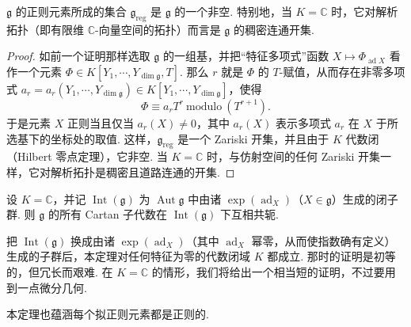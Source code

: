 \begin{lemma*}
$\mathfrak g$ 的正则元素所成的集合 $\mathfrak g_{\mathrm{reg}}$ 是 $\mathfrak g$ 的一个非空. 特别地，当 $K=\mathbb C$ 时，它对解析拓扑（即有限维 $\mathbb C$-向量空间的拓扑）而言是 $\mathfrak g$ 的稠密连通开集.
\end{lemma*}
\begin{proof}
如前一个证明那样选取 $\mathfrak g$ 的一组基，并把``特征多项式''函数 $X\mapsto\Phi_{\operatorname{ad}X}$ 看作一个元素 $\Phi\in K[Y_1,\cdots,Y_{\dim\mathfrak g},T]$. 那么 $r$ 就是 $\Phi$ 的 $T$-赋值，从而存在非零多项式 $a_r=a_r(Y_1,\cdots,Y_{\dim\mathfrak g})\in K[Y_1,\cdots,Y_{\dim\mathfrak g}]$，使得
\[\Phi\equiv a_rT^r\ \text{modulo}\ (T^{r+1}).\]
于是元素 $X$ 正则当且仅当 $a_r(X)\neq 0$，其中 $a_r(X)$ 表示多项式 $a_r$ 在 $X$ 于所选基下的坐标处的取值. 这样，$\mathfrak g_{\mathrm{reg}}$ 是一个 Zariski 开集，并且由于 $K$ 代数闭（Hilbert 零点定理），它非空. 当 $K=\mathbb C$ 时，与仿射空间的任何 Zariski 开集一样，它对解析拓扑是稠密且道路连通的开集.
\end{proof}
\begin{theorem*}
设 $K=\mathbb C$，并记 $\operatorname{Int}(\mathfrak g)$ 为 $\operatorname{Aut}\mathfrak g$ 中由诸 $\exp(\operatorname{ad}_X)$（$X\in\mathfrak g$）生成的闭子群. 则 $\mathfrak g$ 的所有 Cartan 子代数在 $\operatorname{Int}(\mathfrak g)$ 下互相共轭.
\end{theorem*}
\begin{remark*}
把 $\operatorname{Int}(\mathfrak g)$ 换成由诸 $\exp(\operatorname{ad}_X)$（其中 $\operatorname{ad}_X$ 幂零，从而使指数确有定义）生成的子群后，本定理对任何特征为零的代数闭域 $K$ 都成立. 那时的证明是初等的，但冗长而艰难. 在 $K=\mathbb C$ 的情形，我们将给出一个相当短的证明，不过要用到一点微分几何.
\end{remark*}
\begin{remark*}
本定理也蕴涵每个拟正则元素都是正则的.
\end{remark*}
